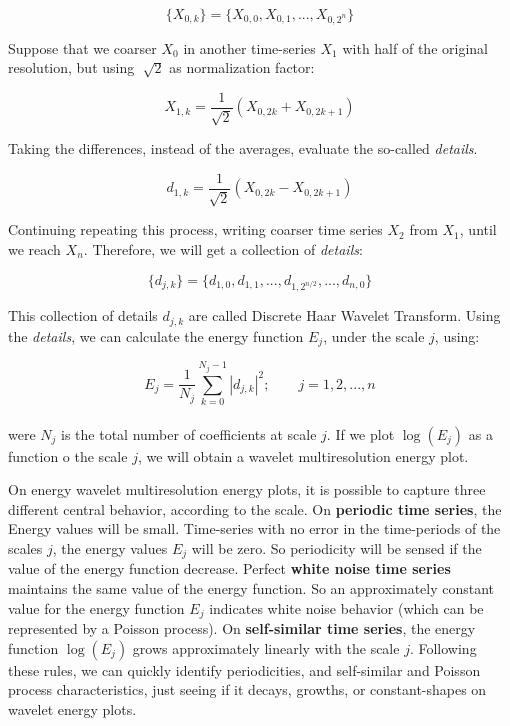 \begin{equation}
\{X_{0,k}\} = \{ X_{0,0}, X_{0,1}, ... ,X_{0,2^{n}} \}
\end{equation} 

Suppose that we coarser $X_{0}$ in another time-series $X_{1}$ with half of the original resolution, but using  $ \sqrt[]{2} $ as normalization factor:

\begin{equation}
X_{1,k} = \frac{1}{\sqrt{2}}(X_{0,2k} + X_{0,2k+1})
\end{equation}

Taking the differences, instead of the averages, evaluate the so-called \textit{details}.

\begin{equation}
d_{1,k} = \frac{1}{\sqrt{2}}(X_{0,2k} - X_{0,2k+1})
\end{equation}

Continuing repeating this process, writing coarser time series $X_{2}$ from $X_{1}$, until we reach $X_{n}$. Therefore, we will get a collection of \textit{details}:

\begin{equation}
\{d_{j,k}\} = \{ d_{1,0}, d_{1,1}, ..., d_{1,2^{n/2}}, ..., d_{n, 0} \}
\end{equation}

This collection of details ${d_{j,k}}$ are called Discrete Haar Wavelet Transform. Using the \textit{details}, we can calculate the energy function $E_{j}$, under the scale $j$, using:

\begin{equation}
E_{j} = \frac{1}{N_{j}} \sum_{k = 0}^{N_{j} - 1} |d_{j,k}|^{2}; \qquad j = 1, 2, ..., n
\end{equation} 
\\ 
were $N_{j}$ is the total number of coefficients at scale $j$. If we plot $\log(E_{j})$ as a function o the scale $j$, we will obtain a wavelet multiresolution energy plot.

On energy wavelet multiresolution energy plots, it is possible to capture three different central behavior, according to the scale. On \textbf{periodic time series}, the Energy values will be small. Time-series with no error in the time-periods of the scales $j$, the energy values $E_{j}$ will be zero. So periodicity will be sensed if the value of the energy function decrease. Perfect \textbf{white noise time series} maintains the same value of the energy function. So an approximately constant value for the energy function $E_{j}$ indicates white noise behavior (which can be represented by a Poisson process\cite{poisson-white-noise}). On \textbf{self-similar time series}, the energy function  $\log(E_{j})$ grows approximately linearly with the scale $j$. Following these rules, we can quickly identify periodicities, and self-similar and Poisson process characteristics, just seeing if it decays, growths, or constant-shapes on wavelet energy plots.

